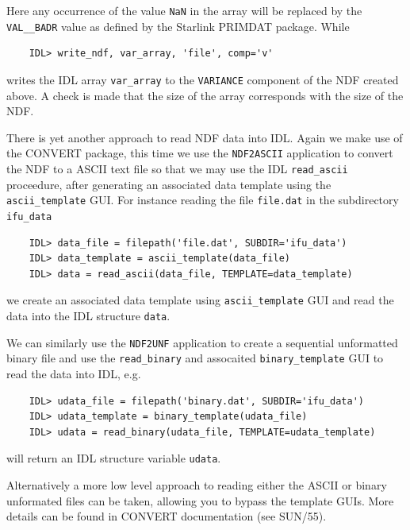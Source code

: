 \documentclass[twoside,11pt]{article}
\newcommand{\xref}[3]{#1}
\begin{document}
Here any occurrence of the value {\tt NaN} in the array will be replaced by the {\tt VAL\_\_BADR} value as defined by the Starlink \xref{PRIMDAT}{sun39}{} package. While 

\small\begin{verbatim}
    IDL> write_ndf, var_array, 'file', comp='v' 
\end{verbatim}\normalsize    
 
writes the IDL array {\tt var\_array} to the {\tt VARIANCE} component of the NDF created above. A check is made that the size of the array corresponds with the size of the NDF. 

There is yet another approach to read NDF data into IDL. Again we make use of the \xref{CONVERT}{sun55}{} package, this time we use the \xref{{\tt NDF2ASCII}}{sun55}{NDF2ASCII} application to convert the NDF to a ASCII text file so that we may use the IDL {\tt read\_ascii} proceedure, after generating an associated data template using the {\tt ascii\_template} GUI. For instance reading the file {\tt file.dat} in the subdirectory {\tt ifu\_data}

\small\begin{verbatim}
    IDL> data_file = filepath('file.dat', SUBDIR='ifu_data')
    IDL> data_template = ascii_template(data_file)
    IDL> data = read_ascii(data_file, TEMPLATE=data_template)
\end{verbatim}\normalsize    

we create an associated data template using {\tt ascii\_template} GUI and read the data into the IDL structure {\tt data}.

We can similarly use the \xref{{\tt NDF2UNF}}{sun55}{NDF2UNF} application to create a sequential unformatted binary file and use the {\tt read\_binary} and assocaited {\tt binary\_template} GUI to read the data into IDL, e.g.

\small\begin{verbatim}
    IDL> udata_file = filepath('binary.dat', SUBDIR='ifu_data')
    IDL> udata_template = binary_template(udata_file)
    IDL> udata = read_binary(udata_file, TEMPLATE=udata_template)
\end{verbatim}\normalsize  

will return an IDL structure variable {\tt udata}.

Alternatively a more low level approach to reading either the ASCII or binary unformated files can be taken, allowing you to bypass the template GUIs. More details can be found in CONVERT documentation (see \xref{SUN/55}{sun55}{}).
 
\end{document}
